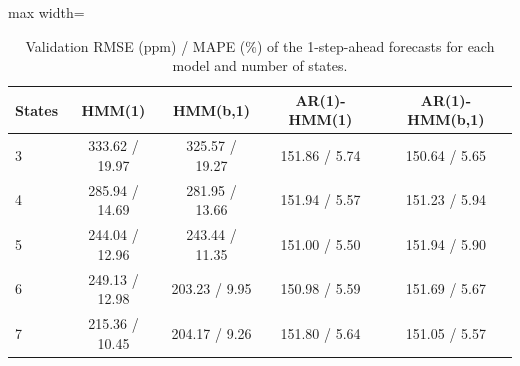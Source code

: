 \begin{table}[ht]
\centering
\begin{adjustbox}{max width=\textwidth}
\begin{tabular}{lcccc}
\hline
States & HMM(1) & HMM(b,1) & AR(1)-HMM(1) & AR(1)-HMM(b,1) \\
\hline
3 & 333.62 / 19.97 & 325.57 / 19.27 & 151.86 / 5.74 & 150.64 / 5.65 \\
4 & 285.94 / 14.69 & 281.95 / 13.66 & 151.94 / 5.57 & 151.23 / 5.94 \\
5 & 244.04 / 12.96 & 243.44 / 11.35 & 151.00 / 5.50 & 151.94 / 5.90 \\
6 & 249.13 / 12.98 & 203.23 / 9.95 & 150.98 / 5.59 & 151.69 / 5.67 \\
7 & 215.36 / 10.45 & 204.17 / 9.26 & 151.80 / 5.64 & 151.05 / 5.57 \\
\hline
\end{tabular}
\end{adjustbox}
\caption{Validation RMSE (ppm) / MAPE (\%) of the 1-step-ahead forecasts for each model and number of states.}
\label{tab:predictive_metrics_room_015_calibrated_anchor_random_search_val_h1}
\end{table}
